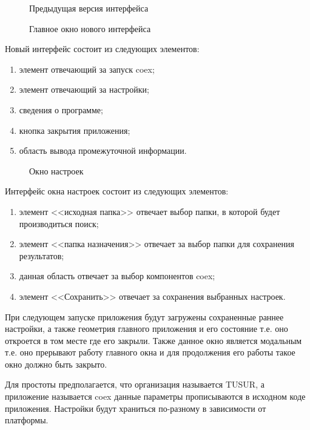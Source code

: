 

\begin{figure}[h!]
\caption{ Предыдущая версия интерфейса }
\label{ship_1:ship_1}
\end{figure}

\begin{figure}[h!]
\caption{ Главное окно нового интерфейса }
\label{ship_2:ship_2}
\end{figure}

Новый интерфейс состоит из следующих элементов:
\begin{enumerate}
  \item элемент отвечающий за запуск coex;
  \item элемент отвечающий за настройки;
  \item сведения о программе;
  \item кнопка закрытия приложения;
  \item область вывода промежуточной информации.
\end{enumerate}

\begin{figure}[h!]
\caption{ Окно настроек }
\label{ship_3:ship_3}
\end{figure}

Интерфейс окна настроек состоит из следующих элементов:
\begin{enumerate}
  \item элемент <<исходная папка>> отвечает выбор папки, в которой будет производиться поиск;
  \item элемент <<папка назначения>> отвечает за выбор папки для сохранения результатов;
  \item данная область отвечает за выбор компонентов coex;
  \item элемент <<Сохранить>> отвечает за сохранения выбранных настроек.
\end{enumerate}

При следующем запуске приложения будут загружены сохраненные раннее настройки, а также геометрия главного приложения и его состояние т.е. оно откроется в том месте где его закрыли. Также данное окно является модальным т.е. оно прерывают работу главного окна и для продолжения его работы такое окно должно быть закрыто.

Для простоты предполагается, что организация называется TUSUR, а приложение называется coex данные параметры прописываются в исходном коде приложения. Настройки будут храниться по-разному в зависимости от платформы.

